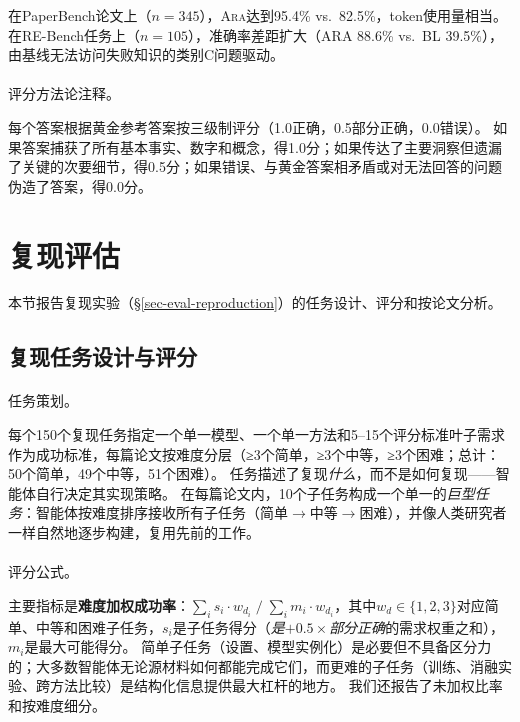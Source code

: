 \documentclass[
]{article}
\makeatletter
\let\oldparagraph\paragraph
\renewcommand{\paragraph}{
    \@ifstar
      \xxxParagraphStar
      \xxxParagraphNoStar
  }
\newcommand{\xxxParagraphStar}[1]{\oldparagraph*{#1}\mbox{}}
\newcommand{\xxxParagraphNoStar}[1]{\oldparagraph{#1}\mbox{}}
\theoremstyle{definition}
\newcommand{\ara}{\textsc{Ara}}
\makeatother
\begin{document}
在PaperBench论文上（\(n = 345\)），\ara{}达到95.4\%
vs.~82.5\%，token使用量相当。
在RE-Bench任务上（\(n = 105\)），准确率差距扩大（ARA 88.6\% vs.~BL
39.5\%），由基线无法访问失败知识的类别C问题驱动。

\paragraph{评分方法论注释。}\label{ux8bc4ux5206ux65b9ux6cd5ux8bbaux6ce8ux91ca}

每个答案根据黄金参考答案按三级制评分（1.0正确，0.5部分正确，0.0错误）。
如果答案捕获了所有基本事实、数字和概念，得1.0分；如果传达了主要洞察但遗漏了关键的次要细节，得0.5分；如果错误、与黄金答案相矛盾或对无法回答的问题伪造了答案，得0.0分。

\section{复现评估}\label{sec-app-reproduction-eval}

本节报告复现实验（\S\ref{sec-eval-reproduction}）的任务设计、评分和按论文分析。

\subsection{复现任务设计与评分}\label{sec-app-repro-scoring}

\paragraph{任务策划。}\label{ux4efbux52a1ux7b56ux5212}

每个150个复现任务指定一个单一模型、一个单一方法和5--15个评分标准叶子需求作为成功标准，每篇论文按难度分层（≥3个简单，≥3个中等，≥3个困难；总计：50个简单，49个中等，51个困难）。
任务描述了复现\emph{什么}，而不是如何复现------智能体自行决定其实现策略。
在每篇论文内，10个子任务构成一个单一的\emph{巨型任务}：智能体按难度排序接收所有子任务（简单\(\to\)中等\(\to\)困难），并像人类研究者一样自然地逐步构建，复用先前的工作。

\paragraph{评分公式。}\label{ux8bc4ux5206ux516cux5f0f}

主要指标是\textbf{难度加权成功率}：\(\sum_i s_i \cdot w_{d_i}\;/\;\sum_i m_i \cdot w_{d_i}\)，其中\(w_d \in \{1,2,3\}\)对应简单、中等和困难子任务，\(s_i\)是子任务得分（\emph{是}\(+  0.5\times\)\emph{部分正确}的需求权重之和），\(m_i\)是最大可能得分。
简单子任务（设置、模型实例化）是必要但不具备区分力的；大多数智能体无论源材料如何都能完成它们，而更难的子任务（训练、消融实验、跨方法比较）是结构化信息提供最大杠杆的地方。
我们还报告了未加权比率和按难度细分。
\end{document}
